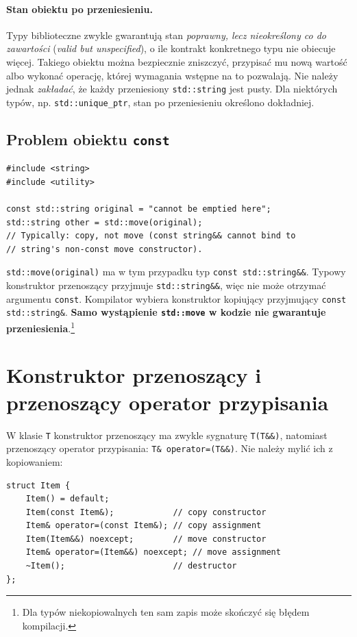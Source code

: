 \paragraph{Stan obiektu po przeniesieniu.}
Typy biblioteczne zwykle gwarantują stan \emph{poprawny, lecz
nieokreślony co do zawartości} (\textit{valid but unspecified}), o ile
kontrakt konkretnego typu nie obiecuje więcej. Takiego obiektu
można bezpiecznie zniszczyć, przypisać mu nową wartość albo
wykonać operację, której wymagania wstępne na to pozwalają.
Nie należy jednak \emph{zakładać}, że każdy przeniesiony
\texttt{std::string} jest pusty. Dla niektórych typów, np.
\texttt{std::unique\_ptr}, stan po przeniesieniu określono dokładniej.

\subsection{Problem obiektu \texttt{const}}

\begin{lstlisting}
#include <string>
#include <utility>

const std::string original = "cannot be emptied here";
std::string other = std::move(original);
// Typically: copy, not move (const string&& cannot bind to
// string's non-const move constructor).
\end{lstlisting}

\texttt{std::move(original)} ma w tym przypadku typ
\texttt{const std::string\&\&}. Typowy konstruktor przenoszący
przyjmuje \texttt{std::string\&\&}, więc nie może otrzymać
argumentu \texttt{const}. Kompilator wybiera konstruktor kopiujący
przyjmujący \texttt{const std::string\&}. \textbf{Samo wystąpienie
\texttt{std::move} w kodzie nie gwarantuje przeniesienia}.\footnote{Dla
typów niekopiowalnych ten sam zapis może skończyć się błędem
kompilacji.}

\section{Konstruktor przenoszący i przenoszący operator przypisania}
\label{sec:move-special-members}

W klasie \texttt{T} konstruktor przenoszący ma zwykle sygnaturę
\texttt{T(T\&\&)}, natomiast przenoszący operator przypisania:
\texttt{T\& operator=(T\&\&)}. Nie należy mylić ich z kopiowaniem:
\begin{lstlisting}
struct Item {
    Item() = default;
    Item(const Item&);            // copy constructor
    Item& operator=(const Item&); // copy assignment
    Item(Item&&) noexcept;        // move constructor
    Item& operator=(Item&&) noexcept; // move assignment
    ~Item();                      // destructor
};
\end{lstlisting}


